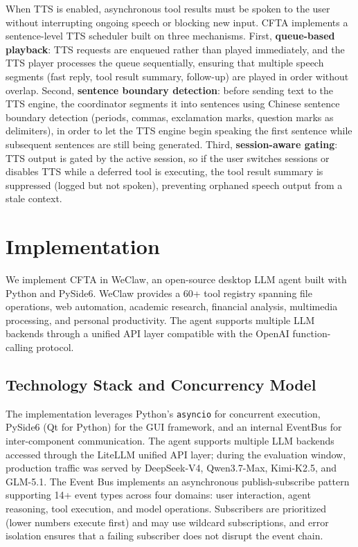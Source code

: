 \documentclass[numbered,mediumone,traditional]{oup-authoring-template}
\begin{document}
When TTS is enabled, asynchronous tool results must be spoken to the user without interrupting ongoing speech or blocking new input. CFTA implements a sentence-level TTS scheduler built on three mechanisms. First, \textbf{queue-based playback}: TTS requests are enqueued rather than played immediately, and the TTS player processes the queue sequentially, ensuring that multiple speech segments (fast reply, tool result summary, follow-up) are played in order without overlap. Second, \textbf{sentence boundary detection}: before sending text to the TTS engine, the coordinator segments it into sentences using Chinese sentence boundary detection (periods, commas, exclamation marks, question marks as delimiters), in order to let the TTS engine begin speaking the first sentence while subsequent sentences are still being generated. Third, \textbf{session-aware gating}: TTS output is gated by the active session, so if the user switches sessions or disables TTS while a deferred tool is executing, the tool result summary is suppressed (logged but not spoken), preventing orphaned speech output from a stale context.

\section{Implementation}

We implement CFTA in WeClaw, an open-source desktop LLM agent built with Python and PySide6. WeClaw provides a 60+ tool registry spanning file operations, web automation, academic research, financial analysis, multimedia processing, and personal productivity. The agent supports multiple LLM backends through a unified API layer compatible with the OpenAI function-calling protocol.

\subsection{Technology Stack and Concurrency Model}

The implementation leverages Python's \texttt{asyncio} for concurrent execution, PySide6 (Qt for Python) for the GUI framework, and an internal EventBus for inter-component communication. The agent supports multiple LLM backends accessed through the LiteLLM unified API layer; during the evaluation window, production traffic was served by DeepSeek-V4, Qwen3.7-Max, Kimi-K2.5, and GLM-5.1. The Event Bus implements an asynchronous publish-subscribe pattern supporting 14+ event types across four domains: user interaction, agent reasoning, tool execution, and model operations. Subscribers are prioritized (lower numbers execute first) and may use wildcard subscriptions, and error isolation ensures that a failing subscriber does not disrupt the event chain.
\end{document}
